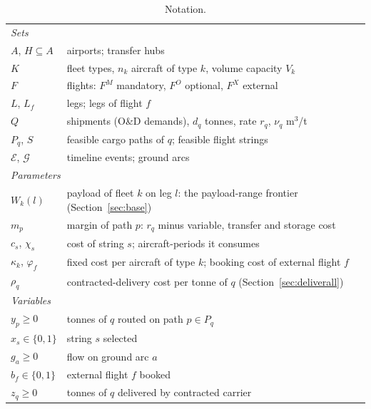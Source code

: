 \documentclass[11pt]{article}
\begin{document}
\begin{table}[t]\centering\small
\begin{tabular}{ll}
\toprule
\multicolumn{2}{l}{\emph{Sets}}\\
$A$, $H\subseteq A$ & airports; transfer hubs \\
$K$ & fleet types, $n_k$ aircraft of type $k$, volume capacity $V_k$ \\
$F$ & flights: $F^{M}$ mandatory, $F^{O}$ optional, $F^{X}$ external \\
$L$, $L_f$ & legs; legs of flight $f$ \\
$Q$ & shipments (O\&D demands), $d_q$ tonnes, rate $r_q$, $\nu_q$ m$^3$/t \\
$P_q$, $S$ & feasible cargo paths of $q$; feasible flight strings \\
$\mathcal{E}$, $\mathcal{G}$ & timeline events; ground arcs \\
\multicolumn{2}{l}{\emph{Parameters}}\\
$W_k(l)$ & payload of fleet $k$ on leg $l$: the payload-range frontier
  (Section~\ref{sec:base}) \\
$m_p$ & margin of path $p$: $r_q$ minus variable, transfer and storage cost \\
$c_s$, $\chi_s$ & cost of string $s$; aircraft-periods it consumes \\
$\kappa_k$, $\varphi_f$ & fixed cost per aircraft of type $k$; booking cost of
  external flight $f$ \\
$\rho_q$ & contracted-delivery cost per tonne of $q$ (Section~\ref{sec:deliverall}) \\
\multicolumn{2}{l}{\emph{Variables}}\\
$y_p\ge 0$ & tonnes of $q$ routed on path $p\in P_q$ \\
$x_s\in\{0,1\}$ & string $s$ selected \\
$g_a\ge 0$ & flow on ground arc $a$ \\
$b_f\in\{0,1\}$ & external flight $f$ booked \\
$z_q\ge 0$ & tonnes of $q$ delivered by contracted carrier \\
\bottomrule
\end{tabular}
\caption{Notation.}\label{tab:notation}
\end{table}
\end{document}
